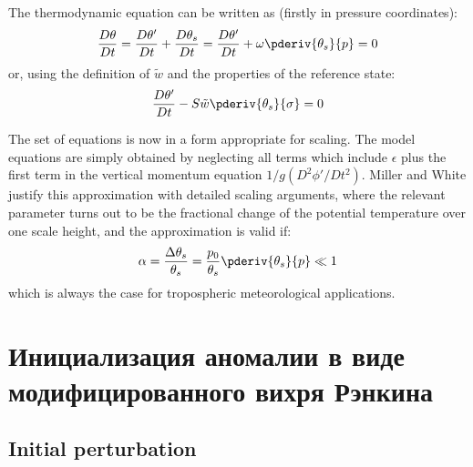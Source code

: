 The thermodynamic equation can be written as (firstly in pressure coordinates):
\begin{equation}
\frac{D\theta}{Dt}=\frac{D\theta'}{Dt}+\frac{D\theta_s}{Dt}=\frac{D\theta'}{Dt}+\omega\pderiv{\theta_s}{p}=0
\end{equation}
or, using the definition of $\tilde{w}$ and the properties of the reference state:
\begin{equation}
\frac{D\theta'}{Dt}-S\tilde{w}\pderiv{\theta_s}{\sigma}=0
\end{equation}

The set of equations is now in a form appropriate for scaling. The model equations are simply obtained by neglecting all terms which include $\epsilon$ plus the first term in the vertical momentum equation $1/g\left(D^2\phi'/Dt^2\right)$. Miller and White justify this approximation with detailed scaling arguments, where the relevant parameter turns out to be the fractional change of the potential temperature over one scale height, and the approximation is valid if:
\begin{equation}
\alpha=\frac{\Delta\theta_s}{\theta_s}=\frac{p_0}{\theta_s}\pderiv{\theta_s}{p}\ll1
\end{equation}
which is always the case for tropospheric meteorological applications.

\chapter{Инициализация аномалии в виде модифицированного вихря Рэнкина}
\label{app:B}
\section{Initial perturbation}
